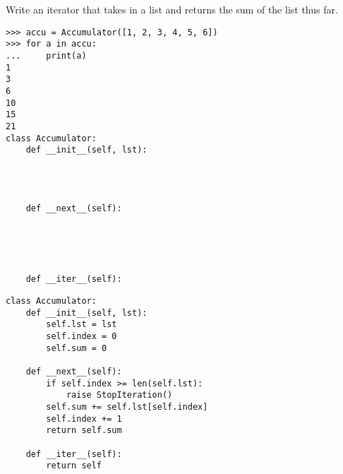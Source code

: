\begin{blocksection}
\question Write an iterator that takes in a list and returns the sum of the list thus far.

\begin{lstlisting}
>>> accu = Accumulator([1, 2, 3, 4, 5, 6])
>>> for a in accu:
...     print(a)
1
3
6
10
15
21
class Accumulator:
    def __init__(self, lst):




    def __next__(self):





    def __iter__(self):
\end{lstlisting}

\begin{solution}[1.5in]
\begin{lstlisting}
class Accumulator:
    def __init__(self, lst):
        self.lst = lst
        self.index = 0
        self.sum = 0

    def __next__(self):
        if self.index >= len(self.lst):
            raise StopIteration()
        self.sum += self.lst[self.index]
        self.index += 1
        return self.sum

    def __iter__(self):
        return self
\end{lstlisting}
\end{solution}
\end{blocksection}
